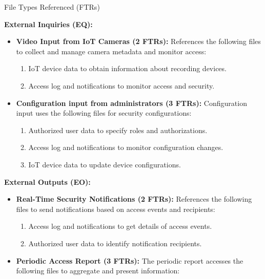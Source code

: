 \documentclass[12pt]{beamer}
\begin{document}
\begin{frame}[allowframebreaks]{File Types Referenced (FTRs)}
\small

\textbf{External Inquiries (EQ):}

\begin{itemize}
    \item \textbf{Video Input from IoT Cameras (2 FTRs):} References the following files to collect and manage camera metadata and monitor access:
    
    \begin{enumerate}
        \item IoT device data to obtain information about recording devices.
        \item Access log and notifications to monitor access and security.
    \end{enumerate}
    
    \item \textbf{Configuration input from administrators (3 FTRs):} Configuration input uses the following files for security configurations:
    
    \begin{enumerate}
        \item Authorized user data to specify roles and authorizations.
        \item Access log and notifications to monitor configuration changes.
        \item IoT device data to update device configurations.
    \end{enumerate}
\end{itemize}

\textbf{External Outputs (EO):}

\begin{itemize}
    \item \textbf{Real-Time Security Notifications (2 FTRs):} References the following files to send notifications based on access events and recipients:
    
    \begin{enumerate}
        \item Access log and notifications to get details of access events.
        \item Authorized user data to identify notification recipients.
    \end{enumerate}
    
    \item \textbf{Periodic Access Report (3 FTRs):} The periodic report accesses the following files to aggregate and present information:
    

\end{itemize}
\end{frame}
\end{document}
